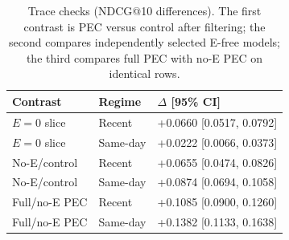 \begin{table}[!htbp]
\renewcommand{\arraystretch}{1.10}
\caption{Trace checks (NDCG@10 differences). The first contrast is PEC versus control after filtering; the second compares independently selected E-free models; the third compares full PEC with no-E PEC on identical rows.}
\label{tab:trace}
\centering
\small
\setlength{\tabcolsep}{3pt}
\begin{tabular*}{\linewidth}{@{\extracolsep{\fill}}lll@{}}
\toprule
Contrast & Regime & $\Delta$ [95\% CI] \\
\midrule
$E=0$ slice & Recent & +0.0660 [0.0517, 0.0792] \\
$E=0$ slice & Same-day & +0.0222 [0.0066, 0.0373] \\
No-E/control & Recent & +0.0655 [0.0474, 0.0826] \\
No-E/control & Same-day & +0.0874 [0.0694, 0.1058] \\
Full/no-E PEC & Recent & +0.1085 [0.0900, 0.1260] \\
Full/no-E PEC & Same-day & +0.1382 [0.1133, 0.1638] \\
\bottomrule
\end{tabular*}
\end{table}

